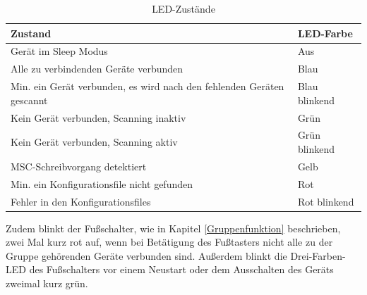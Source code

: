 \begin{table}[H]
	\centering
	\begin{tabular}[H]{l|l}
		Zustand & \ac{LED}-Farbe \\
		\hline
		Gerät im Sleep Modus & Aus \\
		\hline
		Alle zu verbindenden Geräte verbunden & Blau \\
		\hline
		Min. ein Gerät verbunden, es wird nach den fehlenden Geräten gescannt & Blau blinkend \\
		\hline
		Kein Gerät verbunden, Scanning inaktiv & Grün \\
		\hline
		Kein Gerät verbunden, Scanning aktiv & Grün blinkend \\
		\hline
		\ac{MSC}-Schreibvorgang detektiert & Gelb \\
		\hline
		Min. ein Konfigurationsfile nicht gefunden & Rot \\
		\hline
		Fehler in den Konfigurationsfiles & Rot blinkend \\
	\end{tabular}
	\caption{LED-Zustände}
\end{table}

Zudem blinkt der Fußschalter, wie in Kapitel \ref{Gruppenfunktion} beschrieben, zwei Mal kurz rot auf, wenn bei Betätigung des Fußtasters nicht alle zu der Gruppe gehörenden Geräte verbunden sind. Außerdem blinkt die Drei-Farben-\ac{LED} des Fußschalters vor einem Neustart oder dem Ausschalten des Geräts zweimal kurz grün.
